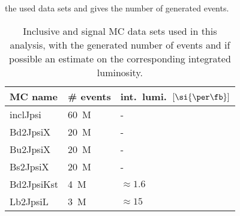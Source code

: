 the used \MC data sets and gives the number of generated events.
%
\begin{table}
\centering
\caption{Inclusive and signal MC data sets used in this analysis, with the
generated number of events and if possible an estimate on the corresponding
integrated luminosity.}
\label{tab:measurement_of_sin2beta:data_preparation:datasamples:mc:samples}
\begin{tabular}{lll}
\toprule
\acs{MC} name & \# events & int.\ lumi.\ $[\si{\per\fb}]$ \\ 
\midrule
inclJpsi    & \SI{60}{M} & -             \\
Bd2JpsiX    & \SI{20}{M} & -             \\
Bu2JpsiX    & \SI{20}{M} & -             \\
Bs2JpsiX    & \SI{20}{M} & -             \\
Bd2JpsiKst  & \SI{4}{M}  & $\approx 1.6$ \\
Lb2JpsiL    & \SI{3}{M}  & $\approx 15$  \\
\bottomrule
\end{tabular}
\end{table}
